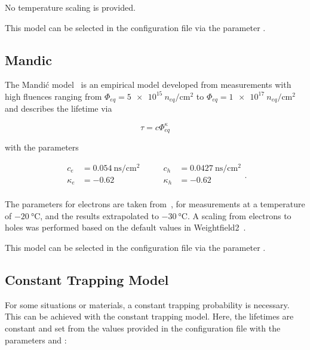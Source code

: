 No temperature scaling is provided.

This model can be selected in the configuration file via the parameter .

\subsection{Mandic}

The Mandi\'{c} model~\cite{Mandic} is an empirical model developed from measurements with high fluences ranging from  $\Phi_{eq} = \SI{5e15}{n_{eq} \per \cm^2}$ to  $\Phi_{eq} = \SI{1e17}{n_{eq} \per \cm^2}$ and describes the lifetime via

\begin{equation*}
    \tau = c\Phi_{eq}^{\kappa}
\end{equation*}

with the parameters

\begin{equation*}
    \begin{split}
        c_e &= \SI{0.054}{\ns \per \cm^2} \\
        \kappa_e   &= -0.62 \\
    \end{split}
    \qquad
    \begin{split}
        c_h &= \SI{0.0427}{\ns \per \cm^2} \\
        \kappa_h   &= -0.62 \\
    \end{split}.
\end{equation*}

The parameters for electrons are taken from~\cite{Mandic}, for measurements at a temperature of $\SI{-20}{\celsius}$, and the results extrapolated to $\SI{-30}{\celsius}$.
A scaling from electrons to holes was performed based on the default values in Weightfield2~\cite{Weightfield2}.

This model can be selected in the configuration file via the parameter .


\subsection{Constant Trapping Model}

For some situations or materials, a constant trapping probability is necessary. This can be achieved with the constant
trapping model. Here, the lifetimes are constant and set from the values provided in the configuration file with the
parameters  and :

